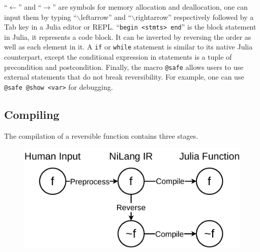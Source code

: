 \documentclass[aps,twocolumn,longbibliography,english,superscriptaddress]{revtex4-1}
\newcommand{\<}{\langle}
\renewcommand{\>}{\rangle}
\theoremstyle{definition}\newtheorem{definition}{\textit{Definition}}
\begin{document}
``\texttt{$\leftarrow$}'' and ``\texttt{$\rightarrow$}'' are symbols for memory allocation and deallocation, one can input them by typing ``$\backslash$leftarrow'' and ``$\backslash$rightarrow'' respectively followed by a Tab key in a Julia editor or REPL.
``\texttt{begin <stmts> end}'' is the block statement in Julia, it represents a code block.
It can be inverted by reversing the order as well as each element in it.
A \texttt{if} or \texttt{while} statement is similar to its native Julia counterpart, except the conditional expression in statements is a tuple of precondition and postcondition.
Finally, the macro \texttt{@safe} allows users to use external statements that do not break reversibility.
For example, one can use \texttt{@safe @show <var>} for debugging.

\subsection{Compiling}
The compilation of a reversible function contains three stages.

\begin{figure}[h]
    \centerline{\includegraphics[width=0.7\columnwidth,trim={0cm 0cm 0 0cm},clip]{images/compiling.pdf}}
\end{figure}
\end{document}
